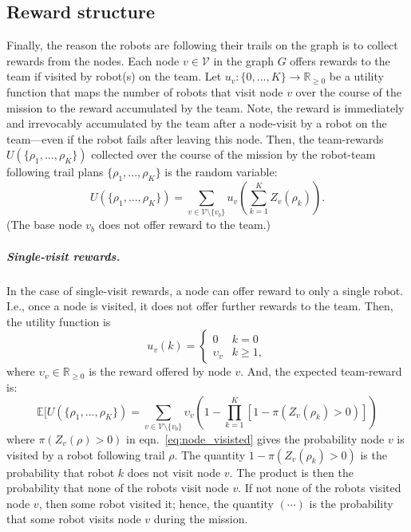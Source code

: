 \documentclass[11pt, oneside]{article}
\begin{document}
\subsection{Reward structure}
Finally, the reason the robots are following their trails on the graph is to collect rewards from the nodes.
Each node $v\in \mathcal{V}$ in the graph $G$ offers rewards to the team if visited by robot(s) on the team. 
Let $u_v: \{0, ..., K\} \rightarrow \mathbb{R}_{\geq 0}$ be a utility function that maps the number of robots that visit node $v$ over the course of the mission to the reward accumulated by the team. 
Note, the reward is immediately and irrevocably accumulated by the team after a node-visit by a robot on the team---even if the robot fails after leaving this node.
Then, the team-rewards $U(\{\rho_1,...,\rho_K\})$ collected over the course of the mission by the robot-team following trail plans $\{\rho_1, ..., \rho_K\}$ is the random variable:
\begin{equation}
U(\{\rho_1,...,\rho_K\}) = \sum_{v\in\mathcal{V}\setminus \{v_b\}} u_v\left ( \sum_{k=1}^K Z_v(\rho_k) \right).
\end{equation}
(The base node $v_b$ does not offer reward to the team.)

\subparagraph{Single-visit rewards.}
In the case of single-visit rewards, a node can offer reward to only a single robot. I.e., once a node is visited, it does not offer further rewards to the team. Then, the utility function is
\begin{equation}
	u_v(k) = \begin{cases}
		0 & k = 0 \\
		\upsilon_v & k \geq 1,
	\end{cases}
\end{equation} where $\upsilon_v \in \mathbb{R}_{\geq 0}$ is the reward offered by node $v$. And, the expected team-reward is:
\begin{equation}
	\mathbb{E}[U(\{\rho_1, ..., \rho_K\}) = \sum_{v \in \mathcal{V} \setminus \{v_b\}} \upsilon_v \left(1 - \prod_{k=1}^K [1 - \pi(Z_v(\rho_k) >0)] \right)
\end{equation} where $\pi(Z_v(\rho) >0)$ in eqn.~\ref{eq:node_visisted} gives the probability node $v$ is visited by a robot following trail $\rho$. 
The quantity $1 - \pi(Z_v(\rho_k) >0)$ is the probability that robot $k$ does not visit node $v$. The product is then the probability that none of the robots visit node $v$. If not none of the robots visited node $v$, then some robot visited it; hence, the quantity $(\cdots)$ is the probability that some robot visits node $v$ during the mission.
\end{document}
